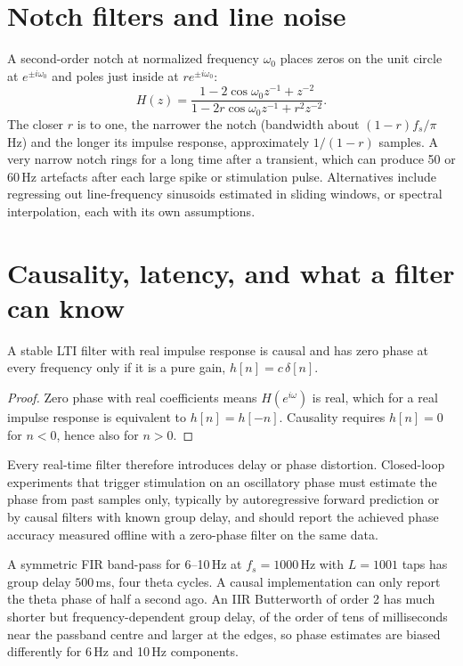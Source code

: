 \section{Notch filters and line noise}
A second-order notch at normalized frequency $\omega_0$ places zeros on
the unit circle at $e^{\pm i\omega_0}$ and poles just inside at
$re^{\pm i\omega_0}$:
\[
H(z)=\frac{1-2\cos\omega_0z^{-1}+z^{-2}}{1-2r\cos\omega_0z^{-1}+r^2z^{-2}}.
\]
The closer $r$ is to one, the narrower the notch (bandwidth about
$(1-r)f_s/\pi$\,Hz) and the longer its impulse response, approximately
$1/(1-r)$ samples. A very narrow notch rings for a long time after a
transient, which can produce 50 or 60\,Hz artefacts after each large
spike or stimulation pulse. Alternatives include regressing out
line-frequency sinusoids estimated in sliding windows, or spectral
interpolation, each with its own assumptions.

\section{Causality, latency, and what a filter can know}
\begin{proposition}
A stable LTI filter with real impulse response is causal and has zero
phase at every frequency only if it is a pure gain, $h[n]=c\,\delta[n]$.
\end{proposition}
\begin{proof}
Zero phase with real coefficients means $H(e^{i\omega})$ is real, which
for a real impulse response is equivalent to $h[n]=h[-n]$. Causality
requires $h[n]=0$ for $n<0$, hence also for $n>0$.
\end{proof}
Every real-time filter therefore introduces delay or phase distortion.
Closed-loop experiments that trigger stimulation on an oscillatory phase
must estimate the phase from past samples only, typically by
autoregressive forward prediction or by causal filters with known group
delay, and should report the achieved phase accuracy measured offline
with a zero-phase filter on the same data.

\begin{example}
A symmetric FIR band-pass for 6--10\,Hz at $f_s=1000$\,Hz with $L=1001$
taps has group delay $500$\,ms, four theta cycles. A causal
implementation can only report the theta phase of half a second ago.
An IIR Butterworth of order 2 has much shorter but frequency-dependent
group delay, of the order of tens of milliseconds near the passband
centre and larger at the edges, so phase estimates are biased
differently for 6\,Hz and 10\,Hz components.
\end{example}

